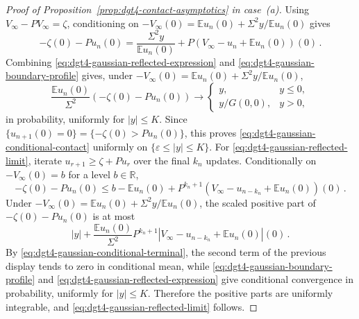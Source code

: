 \documentclass[11pt]{amsart}
\theoremstyle{plain}
\theoremstyle{definition}
\newcommand{\R}{\mathbb{R}}
\newcommand{\E}{\mathbb{E}}
\begin{document}
\begin{proof}[Proof of Proposition~\ref{prop:dgt4-contact-asymptotics} in case~\textup{(a)}]
	Using $V_\infty-PV_\infty=\zeta$, conditioning on $-V_\infty(0)=\E u_n(0)+\Sigma^2y/\E u_n(0)$ gives
	\begin{equation}\label{eq:dgt4-gaussian-reflected-expression}
		-\zeta(0)-Pu_n(0)=\frac{\Sigma^2y}{\E u_n(0)}+P(V_\infty-u_n+\E u_n(0))(0)\, .
	\end{equation}
	Combining \eqref{eq:dgt4-gaussian-reflected-expression} and
	\eqref{eq:dgt4-gaussian-boundary-profile} gives, under $-V_\infty(0)=\E u_n(0)+\Sigma^2y/\E u_n(0)$,
	\[
		\frac{\E u_n(0)}{\Sigma^2}
		(-\zeta(0)-Pu_n(0))
		\longrightarrow
		\begin{cases}
			y,&y\leq0,\\
			y/G(0,0),&y>0,
		\end{cases}
	\]
		in probability, uniformly for $|y|\leq K$. Since
		$\{u_{n+1}(0)=0\}=\{-\zeta(0)>Pu_n(0)\}$, this proves
		\eqref{eq:dgt4-gaussian-conditional-contact} uniformly on $\{\varepsilon\leq|y|\leq K\}$.
	For \eqref{eq:dgt4-gaussian-reflected-limit}, iterate
	$u_{r+1}\geq\zeta+Pu_r$ over the final $k_n$ updates. Conditionally on
	$-V_\infty(0)=b$ for a level $b\in\R$,
	\begin{equation}\label{eq:dgt4-gaussian-terminal-domination}
		-\zeta(0)-Pu_n(0)\leq b-\E u_n(0)+P^{k_n+1}(V_\infty-u_{n-k_n}+\E u_n(0))(0)\, .
	\end{equation}
	Under $-V_\infty(0)=\E u_n(0)+\Sigma^2y/\E u_n(0)$, the scaled positive part of
	$-\zeta(0)-Pu_n(0)$ is at most
	\[
		|y|+\frac{\E u_n(0)}{\Sigma^2}P^{k_n+1}|V_\infty-u_{n-k_n}+\E u_n(0)|(0)\, .
	\]
	By \eqref{eq:dgt4-gaussian-conditional-terminal}, the second term of the previous display tends to zero in conditional mean, while \eqref{eq:dgt4-gaussian-boundary-profile} and \eqref{eq:dgt4-gaussian-reflected-expression} give conditional convergence in probability, uniformly for $|y|\leq K$. Therefore the positive parts are uniformly integrable, and \eqref{eq:dgt4-gaussian-reflected-limit} follows.


\end{proof}
\end{document}
